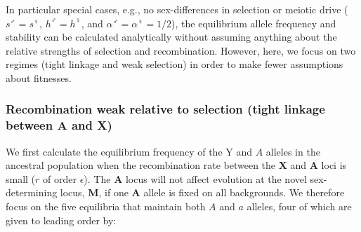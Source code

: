 \documentclass[12pt]{article}
\begin{document}
In particular special cases, e.g., no sex-differences in selection or meiotic drive ($s^\male=s^\female$, $h^\male=h^\female$, and $\alpha^\male=\alpha^\female=1/2$), the equilibrium allele frequency and stability can be calculated analytically without assuming anything about the relative strengths of selection and recombination. 
However, here, we focus on two regimes (tight linkage and weak selection) in order to make fewer assumptions about fitnesses. 

\subsubsection*{Recombination weak relative to selection (tight linkage between \textbf{A} and \textbf{X})}

We first calculate the equilibrium frequency of the Y and $A$ alleles in the ancestral population when the recombination rate between the \textbf{X} and \textbf{A} loci is small ($r$ of order $\epsilon$). 
The \textbf{A} locus will not affect evolution at the novel sex-determining locus, \textbf{M}, if one \textbf{A} allele is fixed on all backgrounds. 
We therefore focus on the five equilibria that maintain both $A$ and $a$ alleles, four of which are given to leading order by:
\end{document}
